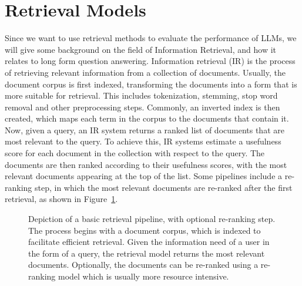 \section{Retrieval Models}\label{sec:retrieval-models}
Since we want to use retrieval methods to evaluate the performance of LLMs, we will give some background on  the field of Information Retrieval, and how it relates to long form question answering.
Information retrieval (IR) is the process of retrieving relevant information from a collection of documents.
Usually, the document corpus is first indexed, transforming the documents into a form that is more suitable for retrieval.
This includes tokenization, stemming, stop word removal and other preprocessing steps.
Commonly, an inverted index is then created, which maps each term in the corpus to the documents that contain it.
Now, given a query, an IR system returns a ranked list of documents that are most relevant to the query.
To achieve this, IR systems estimate a usefulness score for each document in the collection with respect to the query.
The documents are then ranked according to their usefulness scores, with the most relevant documents appearing at the top of the list.
Some pipelines include a re-ranking step, in which the most relevant documents are re-ranked after the first retrieval, as shown in Figure~\ref{fig:reranking_pipeline}.
\begin{figure}[tb]
\centering
{}
\caption{Depiction of a basic retrieval pipeline, with optional re-ranking step. The process begins with a document corpus, which is indexed to facilitate efficient retrieval. Given the information need of a user in the form of a query, the retrieval model returns the most relevant documents. Optionally, the documents can be re-ranked using a re-ranking model which is usually more resource intensive.}
\label{fig:reranking_pipeline}
\end{figure}

